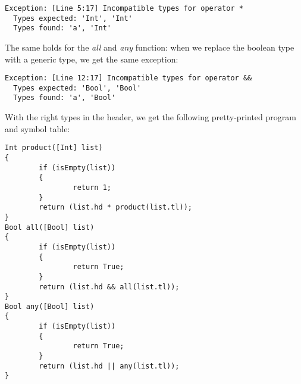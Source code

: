 \documentclass[a4paper]{article}
\begin{document}
\begin{verbatim}
Exception: [Line 5:17] Incompatible types for operator *
  Types expected: 'Int', 'Int'
  Types found: 'a', 'Int'
\end{verbatim}
The same holds for the \emph{all} and \emph{any} function: when we replace the boolean type with a generic type, we get the same exception: 
\begin{verbatim}
Exception: [Line 12:17] Incompatible types for operator &&
  Types expected: 'Bool', 'Bool'
  Types found: 'a', 'Bool'
\end{verbatim}
With the right types in the header, we get the following pretty-printed program and symbol table:
\begin{verbatim}
Int product([Int] list)
{
        if (isEmpty(list))
        {
                return 1;
        }
        return (list.hd * product(list.tl));
}
Bool all([Bool] list)
{
        if (isEmpty(list))
        {
                return True;
        }
        return (list.hd && all(list.tl));
}
Bool any([Bool] list)
{
        if (isEmpty(list))
        {
                return True;
        }
        return (list.hd || any(list.tl));
}


\end{verbatim}
\end{document}
